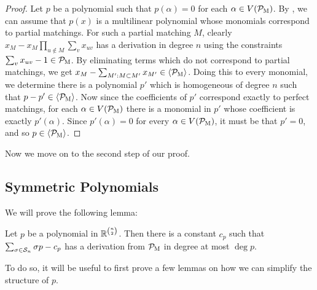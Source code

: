 \begin{proof}
Let $p$ be a polynomial such that $p(\alpha) = 0$ for each $\alpha \in V(\mathcal P_{\textsc{M}})$. By , we can assume that $p(x)$ is a multilinear polynomial whose monomials correspond to partial matchings. For such a partial matching $M$, clearly $x_M - x_M\prod_{u \notin M} \sum_v x_{uv}$ has a derivation in degree $n$ using the constraints $\sum_v x_{uv} - 1 \in \mathcal P_{\textsc{M}}$. By eliminating terms which do not correspond to partial matchings, we get $x_M - \sum_{M': M \subset M'} x_{M'} \in \langle \mathcal P_{\textsc{M}} \rangle$. Doing this to every monomial, we determine there is a polynomial $p'$ which is homogeneous of degree $n$ such that $p - p' \in \langle \mathcal P_{\textsc{M}} \rangle$. Now since the coefficients of $p'$ correspond exactly to perfect matchings, for each $\alpha \in V(\mathcal P_{\textsc{M}})$ there is a monomial in $p'$ whose coefficient is exactly $p'(\alpha)$. Since $p'(\alpha) = 0$ for every $\alpha \in V(\mathcal P_{\textsc{M}})$, it must be that $p' = 0$, and so $p \in \langle \mathcal P_{\textsc{M}} \rangle$.
\end{proof}
Now we move on to the second step of our proof. 

\subsection{Symmetric Polynomials}

We will prove the following lemma: 
\begin{lemma}
  \label{lem:constant}
  Let $p$ be a polynomial in $\mathbb R^{\binom{n}{2}}$.
	Then there is a constant $c_p$ such that $\sum_{\sigma \in \mathcal S_n} \sigma p - c_p$ has a derivation from $\mathcal P_{\textsc{M}}$ in degree at most $\deg p$. 
\end{lemma}
To do so, it will be useful to first prove a few lemmas on how we can simplify the structure of $p$. 

